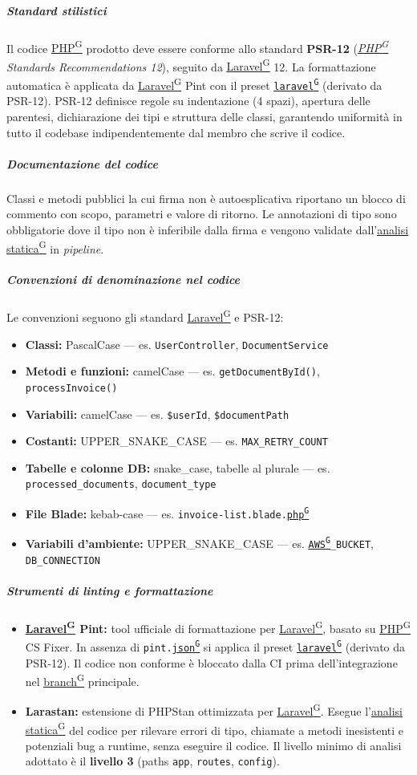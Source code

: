 \documentclass[a4paper,12pt]{article}
\providecommand{\glslink}[2]{\href{https://alittlebyte-19.github.io/Documentazione/glossario.html\#gls-#1}{\underline{#2}\textsuperscript{\scriptsize G}}}
\begin{document}
\subparagraph{Standard stilistici}
Il codice \glslink{php}{PHP} prodotto deve essere conforme allo standard \textbf{PSR-12} (\textit{\glslink{php}{PHP} Standards Recommendations 12}), seguito da \glslink{laravel}{Laravel} 12. La formattazione automatica è applicata da \glslink{laravel}{Laravel} Pint con il preset \texttt{\glslink{laravel}{laravel}} (derivato da PSR-12). PSR-12 definisce regole su indentazione (4 spazi), apertura delle parentesi, dichiarazione dei tipi e struttura delle classi, garantendo uniformità in tutto il codebase indipendentemente dal membro che scrive il codice.

\subparagraph{Documentazione del codice}
Classi e metodi pubblici la cui firma non è autoesplicativa riportano un blocco di commento con scopo, parametri e valore di ritorno. Le annotazioni di tipo sono obbligatorie dove il tipo non è inferibile dalla firma e vengono validate dall'\glslink{analisi-statica}{analisi statica} in \textit{pipeline}.

\subparagraph{Convenzioni di denominazione nel codice}
Le convenzioni seguono gli standard \glslink{laravel}{Laravel} e PSR-12:
\begin{itemize}
    \item \textbf{Classi:} PascalCase — es. \texttt{UserController}, \texttt{DocumentService}
    \item \textbf{Metodi e funzioni:} camelCase — es. \texttt{getDocumentById()}, \texttt{processInvoice()}
    \item \textbf{Variabili:} camelCase — es. \texttt{\$userId}, \texttt{\$documentPath}
    \item \textbf{Costanti:} UPPER\_SNAKE\_CASE — es. \texttt{MAX\_RETRY\_COUNT}
    \item \textbf{Tabelle e colonne DB:} snake\_case, tabelle al plurale — es. \texttt{processed\_documents}, \texttt{document\_type}
    \item \textbf{File Blade:} kebab-case — es. \texttt{invoice-list.blade.\glslink{php}{php}}
    \item \textbf{Variabili d'ambiente:} UPPER\_SNAKE\_CASE — es. \texttt{\glslink{aws}{AWS}\_BUCKET}, \texttt{DB\_CONNECTION}
\end{itemize}

\subparagraph{Strumenti di linting e formattazione}
\begin{itemize}
    \item \textbf{\glslink{laravel}{Laravel} Pint:} tool ufficiale di formattazione per \glslink{laravel}{Laravel}, basato su \glslink{php}{PHP} CS Fixer. In assenza di \texttt{pint.\glslink{json}{json}} si applica il preset \texttt{\glslink{laravel}{laravel}} (derivato da PSR-12). Il codice non conforme è bloccato dalla CI prima dell'integrazione nel \glslink{branch}{branch} principale.
    \item \textbf{Larastan:} estensione di PHPStan ottimizzata per \glslink{laravel}{Laravel}. Esegue l'\glslink{analisi-statica}{analisi statica} del codice per rilevare errori di tipo, chiamate a metodi inesistenti e potenziali bug a runtime, senza eseguire il codice. Il livello minimo di analisi adottato è il \textbf{livello 3} (paths \texttt{app}, \texttt{routes}, \texttt{config}).
\end{itemize}
\end{document}
